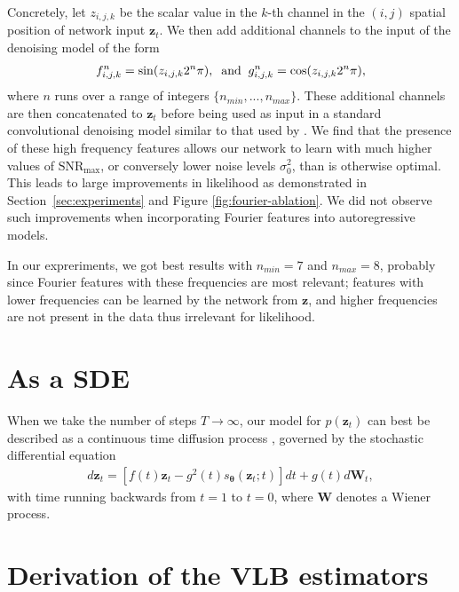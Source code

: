 \documentclass{article}
\def\rvz{{\mathbf{z}}}
\newcommand{\bT}{{\boldsymbol{\theta}}}
\newcommand{\snrmax}{\text{SNR}_{\text{max}}}
\def\rvW{{\mathbf{W}}}
\begin{document}
Concretely, let $z_{i,j,k}$ be the scalar value in the $k$-th channel in the $(i,j)$ spatial position of network input $\rvz_t$. We then add additional channels to the input of the denoising model of the form
\begin{align}
f^{n}_{i,j,k} = \sin(z_{i,j,k}2^{n}\pi), \text{\;\;and\;\;} g^{n}_{i,j,k} = \cos(z_{i,j,k}2^{n}\pi),
\end{align}
where $n$ runs over a range of integers $\{n_{min}, ..., n_{max}\}$. These additional channels are then concatenated to $\rvz_t$ before being used as input in a standard convolutional denoising model similar to that used by \citet{ho2020denoising}. We find that the presence of these high frequency features allows our network to learn with much higher values of $\snrmax$, or conversely lower noise levels $\sigma^{2}_{0}$, than is otherwise optimal. This leads to large improvements in likelihood as demonstrated in Section~\ref{sec:experiments} and Figure \ref{fig:fourier-ablation}. We did not observe such improvements when incorporating Fourier features into autoregressive models.

In our expreriments, we got best results with $n_{min}=7$ and $n_{max}=8$, probably since Fourier features with these frequencies are most relevant; features with lower frequencies can be learned by the network from $\rvz$, and higher frequencies are not present in the data thus irrelevant for likelihood.

\section{As a SDE}
\label{sec:sde}
When we take the number of steps $T\rightarrow\infty$, our model for $p(\rvz_t)$ can best be described as a continuous time diffusion process \citep{song2020score}, governed by the stochastic differential equation
\begin{align}
d\rvz_t = [f(t)\rvz_{t} - g^{2}(t)s_{\bT}(\rvz_t; t)] dt + g(t)d\rvW_{t},
\end{align}
with time running backwards from $t=1$ to $t=0$, where $\rvW$ denotes a Wiener process.




\section{Derivation of the VLB estimators}
\label{sec:objective}
\end{document}
